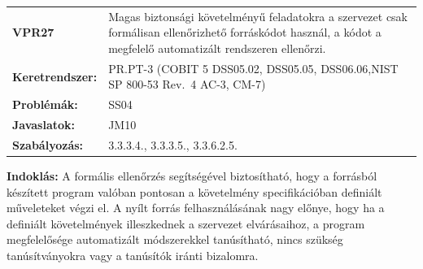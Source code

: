 \documentclass[12pt,magyar,a4paper,oneside]{scrreprt}
\begin{document}
\begin{longtable}[]{@{}ll@{}}
\toprule
\endhead
\begin{minipage}[t]{0.16\columnwidth}\raggedright
\textbf{VPR27}\strut
\end{minipage} & \begin{minipage}[t]{0.79\columnwidth}\raggedright
Magas biztonsági követelményű feladatokra a szervezet csak formálisan
ellenőrizhető forráskódot használ, a kódot a megfelelő automatizált
rendszeren ellenőrzi.\strut
\end{minipage}\tabularnewline
\begin{minipage}[t]{0.16\columnwidth}\raggedright
\textbf{Keretrendszer:}\strut
\end{minipage} & \begin{minipage}[t]{0.79\columnwidth}\raggedright
PR.PT-3 (COBIT 5 DSS05.02, DSS05.05, DSS06.06,NIST SP 800-53 Rev.~4
AC-3, CM-7)\strut
\end{minipage}\tabularnewline
\begin{minipage}[t]{0.16\columnwidth}\raggedright
\textbf{Problémák:}\strut
\end{minipage} & \begin{minipage}[t]{0.79\columnwidth}\raggedright
SS04\strut
\end{minipage}\tabularnewline
\begin{minipage}[t]{0.16\columnwidth}\raggedright
\textbf{Javaslatok:}\strut
\end{minipage} & \begin{minipage}[t]{0.79\columnwidth}\raggedright
JM10\strut
\end{minipage}\tabularnewline
\begin{minipage}[t]{0.16\columnwidth}\raggedright
\textbf{Szabályozás:}\strut
\end{minipage} & \begin{minipage}[t]{0.79\columnwidth}\raggedright
3.3.3.4., 3.3.3.5., 3.3.6.2.5.\strut
\end{minipage}\tabularnewline
\bottomrule
\end{longtable}

\textbf{Indoklás: } A formális ellenőrzés segítségével biztosítható,
hogy a forrásból készített program valóban pontosan a követelmény
specifikációban definiált műveleteket végzi el. A nyílt forrás
felhasználásának nagy előnye, hogy ha a definiált követelmények
illeszkednek a szervezet elvárásaihoz, a program megfelelősége
automatizált módszerekkel tanúsítható, nincs szükség tanúsítványokra
vagy a tanúsítók iránti bizalomra.
\end{document}
